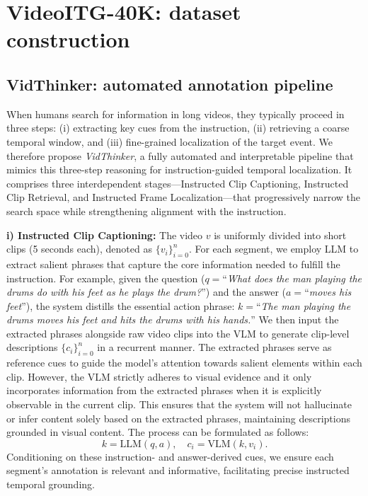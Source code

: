 \section{VideoITG-40K: dataset construction}


\subsection{VidThinker: automated annotation pipeline}
\label{pipeline}
When humans search for information in long videos, they typically proceed in three steps: (i) extracting key cues from the instruction, (ii) retrieving a coarse temporal window, and (iii) fine-grained localization of the target event. We therefore propose \textit{VidThinker}, a fully automated and interpretable pipeline that mimics this three-step reasoning for instruction-guided temporal localization. It comprises three interdependent stages—Instructed Clip Captioning, Instructed Clip Retrieval, and Instructed Frame Localization—that progressively narrow the search space while strengthening alignment with the instruction.


\noindent\textbf{i) Instructed Clip Captioning:} The video $v$ is uniformly divided into short clips (5 seconds each), denoted as $\{v_i\}_{i=0}^n$. For each segment, we employ LLM to extract salient phrases that capture the core information needed to fulfill the instruction. For example, given the question ($q = $``\textit{What does the man playing the drums do with his feet as he plays the drum?}'') and the answer ($a = $``\textit{moves his feet}''), the system distills the essential action phrase: $k =$``\textit{The man playing the drums moves his feet and hits the drums with his hands.}'' We then input the extracted phrases alongside raw video clips into the VLM to generate clip-level descriptions $\{c_i\}_{i=0}^n$ in a recurrent manner. The extracted phrases serve as reference cues to guide the model's attention towards salient elements within each clip.  However, the VLM strictly adheres to visual evidence and it only incorporates information from the extracted phrases when it is explicitly observable in the current clip. This ensures that the system will not hallucinate or infer content solely based on the extracted phrases, maintaining descriptions grounded in visual content. The process can be formulated as follows:
\begin{equation}
    k = \mathrm{LLM}(q, a),\quad c_i = \mathrm{VLM}(k, v_i).
\end{equation}
Conditioning on these instruction- and answer-derived cues, we ensure each segment's annotation is relevant and informative, facilitating precise instructed temporal grounding.


